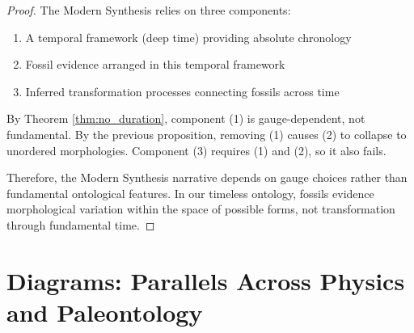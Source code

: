 \documentclass[11pt]{article}
\theoremstyle{definition}
\theoremstyle{plain}
\theoremstyle{remark}
\begin{document}
\begin{proof}
The Modern Synthesis relies on three components:
\begin{enumerate}
\item A temporal framework (deep time) providing absolute chronology
\item Fossil evidence arranged in this temporal framework
\item Inferred transformation processes connecting fossils across time
\end{enumerate}

By Theorem \ref{thm:no_duration}, component (1) is gauge-dependent, not fundamental. By the previous proposition, removing (1) causes (2) to collapse to unordered morphologies. Component (3) requires (1) and (2), so it also fails.

Therefore, the Modern Synthesis narrative depends on gauge choices rather than fundamental ontological features. In our timeless ontology, fossils evidence morphological variation within the space of possible forms, not transformation through fundamental time.
\end{proof}

\section{Diagrams: Parallels Across Physics and Paleontology}
\end{document}

